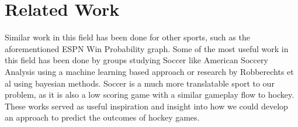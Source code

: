 \documentclass{article}
\begin{document}
\section{Related Work}
Similar work in this field has been done for other sports, such as the aforementioned ESPN Win Probability graph.
Some of the most useful work in this field has been done by groups studying Soccer like American Soccery Analysis using a 
machine learning based approach \cite{richardett} or research by Robberechts et al \cite{bayesian} using bayesian methods. Soccer
is a much more translatable sport to our problem, as it is also a low scoring game with a similar gameplay flow to hockey.
These works served as useful inspiration and insight into how we could develop an approach to predict the outcomes of hockey games.

\nocite{*}


\end{document}
